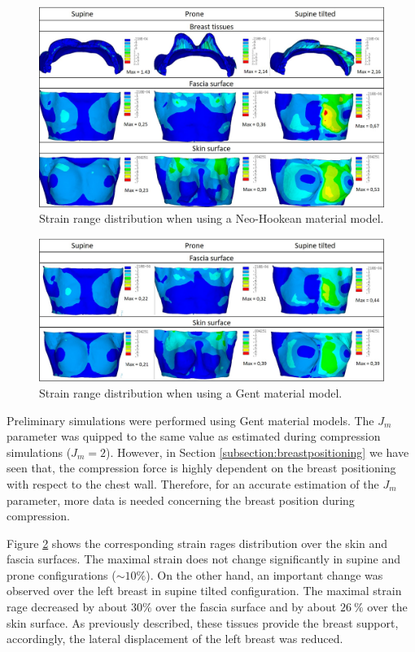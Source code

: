 \begin{figure}[!h]
\centering
\includegraphics[width=\textwidth,keepaspectratio]{figures/strain_range_neo.jpg} 
\caption{Strain range distribution when using a Neo-Hookean material model. }\label{fig:strain_range_neo}
\end{figure}
 

\begin{figure}[!h]
\centering
\includegraphics[width=\textwidth,keepaspectratio]{figures/strain_range_gent.jpg} 
\caption{Strain range distribution when using a Gent material model. }\label{fig:strain_range_gent}
\end{figure}

Preliminary simulations were performed using Gent material models. The $J_m$ parameter was quipped to the same value as estimated during compression simulations ($J_m = 2$). However, in Section \ref{subsection:breastpositioning} we have seen that, the compression force is highly dependent on the breast positioning with respect to the chest wall. Therefore, for an accurate estimation of the $J_m$  parameter, more data is needed concerning the breast position during compression. 


Figure \ref{fig:strain_range_gent} shows the corresponding strain rages distribution over the skin and fascia surfaces.  The maximal strain does not change significantly in supine and prone configurations ($\sim 10\%$). On the other hand, an important change was observed over the left breast in supine tilted configuration. The maximal strain rage decreased by about $30\%$ over the fascia surface and by about $26 \ \%$ over the skin surface. As previously described, these tissues provide the breast support, accordingly,  the lateral displacement of the left breast was reduced.

